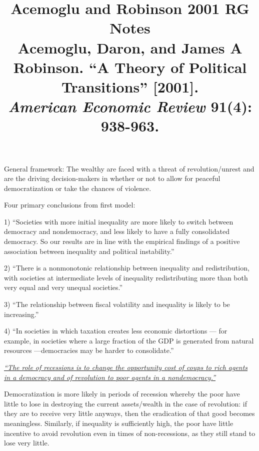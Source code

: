 \documentclass[12pt]{article}
\title{\textbf{Acemoglu and Robinson 2001 RG Notes}\\
\large Acemoglu, Daron, and James A Robinson. ``A Theory of Political Transitions'' [2001].\\
\textit{American Economic Review} 91(4): 938-963.}
\author{}
\date{}
\begin{document}
\maketitle

General framework: The wealthy are faced with a threat of revolution/unrest and are the driving decision-makers in whether or not to allow for peaceful democratization or take the chances of violence.

Four primary conclusions from first model:

1) ``Societies with more initial inequality are more likely to switch between democracy and nondemocracy, and less likely to have a fully consolidated democracy. So our results are in line with the empirical findings of a positive association between inequality and political instability.''

2) ``There is a nonmonotonic relationship between inequality and redistribution, with societies at intermediate levels of inequality redistributing more than both very equal and very unequal societies.''

3) ``The relationship between fiscal volatility and inequality is likely to be increasing.''

4) ``In societies in which taxation creates less economic distortions --- for example, in societies where a large fraction of the GDP is generated from natural resources ---democracies may be harder to consolidate.''

\textit{\underline{``The role of recessions is to change the opportunity cost of coups to rich agents in a democracy and of revolution to poor agents in a nondemocracy.''}}

Democratization is more likely in periods of recession whereby the poor have little to lose in destroying the current assets/wealth in the case of revolution: if they are to receive very little anyways, then the eradication of that good becomes meaningless. Similarly, if inequality is sufficiently high, the poor have little incentive to avoid revolution even in times of non-recessions, as they still stand to lose very little.
\end{document}
